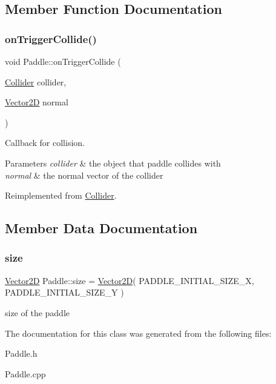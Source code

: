 \subsection{Member Function Documentation}
\mbox{\label{class_paddle_a90bc62843d04bcd291ab799d323002cf}} 
\subsubsection{\texorpdfstring{on\+Trigger\+Collide()}{onTriggerCollide()}}
{\footnotesize\ttfamily void Paddle\+::on\+Trigger\+Collide (\begin{DoxyParamCaption}\item[{\mbox{\hyperlink{class_collider}{Collider}}}]{collider,  }\item[{\mbox{\hyperlink{struct_vector2_d}{Vector2D}}}]{normal }\end{DoxyParamCaption})\hspace{0.3cm}{\ttfamily [virtual]}}



Callback for collision. 


\begin{DoxyParams}{Parameters}
{\em collider} & the object that paddle collides with \\
\hline
{\em normal} & the normal vector of the collider \\
\hline
\end{DoxyParams}


Reimplemented from \mbox{\hyperlink{class_collider_ae17ec8f9110acbc4df79d5addf8ac401}{Collider}}.



\subsection{Member Data Documentation}
\mbox{\label{class_paddle_aa41c1f9a0b8d77d2aba050810cba9b61}} 
\subsubsection{\texorpdfstring{size}{size}}
{\footnotesize\ttfamily \mbox{\hyperlink{struct_vector2_d}{Vector2D}} Paddle\+::size = \mbox{\hyperlink{struct_vector2_d}{Vector2D}}( P\+A\+D\+D\+L\+E\+\_\+\+I\+N\+I\+T\+I\+A\+L\+\_\+\+S\+I\+Z\+E\+\_\+X, P\+A\+D\+D\+L\+E\+\_\+\+I\+N\+I\+T\+I\+A\+L\+\_\+\+S\+I\+Z\+E\+\_\+Y )\hspace{0.3cm}{\ttfamily [private]}}

size of the paddle 

The documentation for this class was generated from the following files\+:\begin{DoxyCompactItemize}
\item 
Paddle.\+h\item 
Paddle.\+cpp\end{DoxyCompactItemize}
